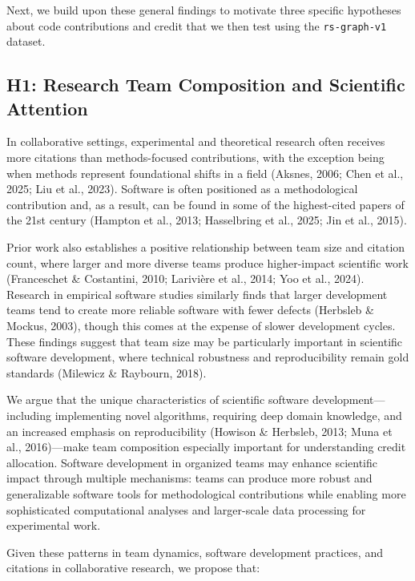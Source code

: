 \documentclass[
  number,
  3p,
  onecolumn]{elsarticle}
\begin{document}
Next, we build upon these general findings to motivate three specific
hypotheses about code contributions and credit that we then test using
the \texttt{rs-graph-v1} dataset.

\subsection{H1: Research Team Composition and Scientific
Attention}\label{h1-research-team-composition-and-scientific-attention}

In collaborative settings, experimental and theoretical research often
receives more citations than methods-focused contributions, with the
exception being when methods represent foundational shifts in a field
(Aksnes, 2006; Chen et al., 2025; Liu et al., 2023). Software is often
positioned as a methodological contribution and, as a result, can be
found in some of the highest-cited papers of the 21st century (Hampton
et al., 2013; Hasselbring et al., 2025; Jin et al., 2015).

Prior work also establishes a positive relationship between team size
and citation count, where larger and more diverse teams produce
higher-impact scientific work (Franceschet \& Costantini, 2010;
Larivière et al., 2014; Yoo et al., 2024). Research in empirical
software studies similarly finds that larger development teams tend to
create more reliable software with fewer defects (Herbsleb \& Mockus,
2003), though this comes at the expense of slower development cycles.
These findings suggest that team size may be particularly important in
scientific software development, where technical robustness and
reproducibility remain gold standards (Milewicz \& Raybourn, 2018).

We argue that the unique characteristics of scientific software
development---including implementing novel algorithms, requiring deep
domain knowledge, and an increased emphasis on reproducibility (Howison
\& Herbsleb, 2013; Muna et al., 2016)---make team composition
especially important for understanding credit allocation. Software
development in organized teams may enhance scientific impact through
multiple mechanisms: teams can produce more robust and generalizable
software tools for methodological contributions while enabling more
sophisticated computational analyses and larger-scale data processing
for experimental work.

Given these patterns in team dynamics, software development practices,
and citations in collaborative research, we propose that:
\end{document}
